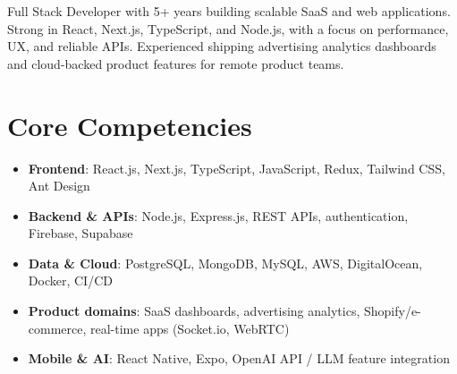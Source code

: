 \documentclass[11pt,a4paper,sans]{moderncv}
\begin{document}
\makecvtitle

\vspace{6pt}
\small{Full Stack Developer with 5+ years building scalable SaaS and web applications. Strong in React, Next.js, TypeScript, and Node.js, with a focus on performance, UX, and reliable APIs. Experienced shipping advertising analytics dashboards and cloud-backed product features for remote product teams.}

\section{Core Competencies}
\vspace{1pt}
\begin{itemize}
\item \textbf{Frontend}: React.js, Next.js, TypeScript, JavaScript, Redux, Tailwind CSS, Ant Design
\item \textbf{Backend \& APIs}: Node.js, Express.js, REST APIs, authentication, Firebase, Supabase
\item \textbf{Data \& Cloud}: PostgreSQL, MongoDB, MySQL, AWS, DigitalOcean, Docker, CI/CD
\item \textbf{Product domains}: SaaS dashboards, advertising analytics, Shopify/e-commerce, real-time apps (Socket.io, WebRTC)
\item \textbf{Mobile \& AI}: React Native, Expo, OpenAI API / LLM feature integration
\end{itemize}
\end{document}
